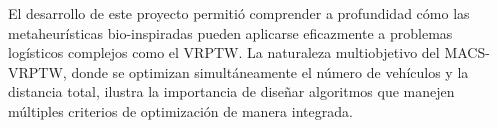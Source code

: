 \documentclass[12pt, letterpaper]{article}
\begin{document}
El desarrollo de este proyecto permitió comprender a profundidad cómo las metaheurísticas bio-inspiradas pueden aplicarse eficazmente a problemas logísticos complejos como el VRPTW. La naturaleza multiobjetivo del MACS-VRPTW, donde se optimizan simultáneamente el número de vehículos y la distancia total, ilustra la importancia de diseñar algoritmos que manejen múltiples criterios de optimización de manera integrada.


\newpage
\renewcommand{\refname}{Referencias}
\end{document}
